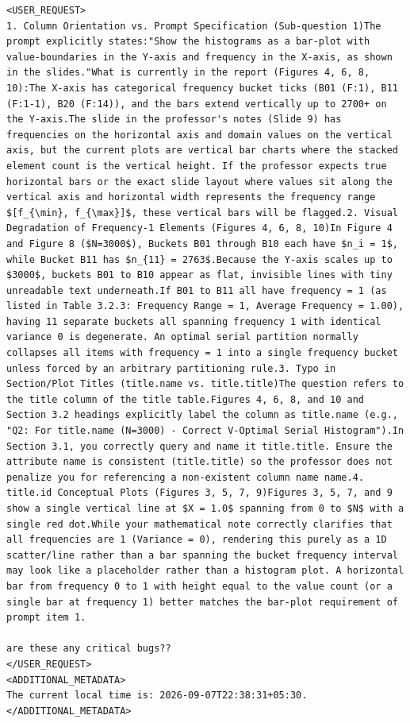 \documentclass[11pt,a4paper]{article}
\begin{document}
\begin{lstlisting}[language=text]
<USER_REQUEST>
1. Column Orientation vs. Prompt Specification (Sub-question 1)The prompt explicitly states:"Show the histograms as a bar-plot with value-boundaries in the Y-axis and frequency in the X-axis, as shown in the slides."What is currently in the report (Figures 4, 6, 8, 10):The X-axis has categorical frequency bucket ticks (B01 (F:1), B11 (F:1-1), B20 (F:14)), and the bars extend vertically up to 2700+ on the Y-axis.The slide in the professor's notes (Slide 9) has frequencies on the horizontal axis and domain values on the vertical axis, but the current plots are vertical bar charts where the stacked element count is the vertical height. If the professor expects true horizontal bars or the exact slide layout where values sit along the vertical axis and horizontal width represents the frequency range $[f_{\min}, f_{\max}]$, these vertical bars will be flagged.2. Visual Degradation of Frequency-1 Elements (Figures 4, 6, 8, 10)In Figure 4 and Figure 8 ($N=3000$), Buckets B01 through B10 each have $n_i = 1$, while Bucket B11 has $n_{11} = 2763$.Because the Y-axis scales up to $3000$, buckets B01 to B10 appear as flat, invisible lines with tiny unreadable text underneath.If B01 to B11 all have frequency = 1 (as listed in Table 3.2.3: Frequency Range = 1, Average Frequency = 1.00), having 11 separate buckets all spanning frequency 1 with identical variance 0 is degenerate. An optimal serial partition normally collapses all items with frequency = 1 into a single frequency bucket unless forced by an arbitrary partitioning rule.3. Typo in Section/Plot Titles (title.name vs. title.title)The question refers to the title column of the title table.Figures 4, 6, 8, and 10 and Section 3.2 headings explicitly label the column as title.name (e.g., "Q2: For title.name (N=3000) - Correct V-Optimal Serial Histogram").In Section 3.1, you correctly query and name it title.title. Ensure the attribute name is consistent (title.title) so the professor does not penalize you for referencing a non-existent column name name.4. title.id Conceptual Plots (Figures 3, 5, 7, 9)Figures 3, 5, 7, and 9 show a single vertical line at $X = 1.0$ spanning from 0 to $N$ with a single red dot.While your mathematical note correctly clarifies that all frequencies are 1 (Variance = 0), rendering this purely as a 1D scatter/line rather than a bar spanning the bucket frequency interval may look like a placeholder rather than a histogram plot. A horizontal bar from frequency 0 to 1 with height equal to the value count (or a single bar at frequency 1) better matches the bar-plot requirement of prompt item 1.

are these any critical bugs??
</USER_REQUEST>
<ADDITIONAL_METADATA>
The current local time is: 2026-09-07T22:38:31+05:30.
</ADDITIONAL_METADATA>
\end{lstlisting}
\end{document}
